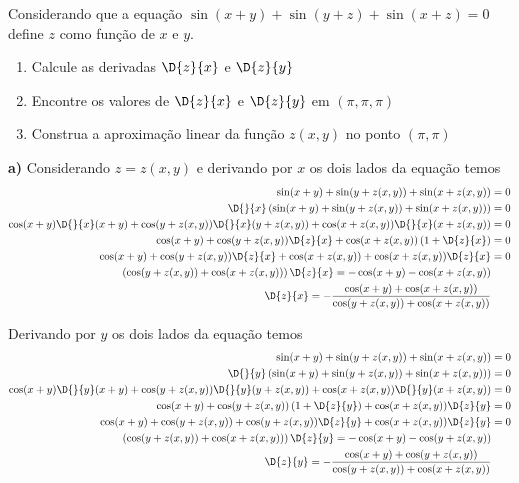 \documentclass[a4paper,12pt,fleqn]{article}
\begin{document}

Considerando que a equação
\(
  \sin(x+y) + \sin(y+z) + \sin(x+z) = 0
\)
define $z$ como função de $x$ e $y$.
\begin{enumerate}[label=\alph*)]
  \item Calcule as derivadas \(\D{z}{x}\) e \(\D{z}{y}\)
  \item Encontre os valores de \(\D{z}{x}\) e \(\D{z}{y}\) em \((\pi, \pi, \pi)\)
  \item Construa a aproximação linear da função $z(x, y)$ no ponto \((\pi, \pi)\)
\end{enumerate}
\clearpagequestiononly

\begin{answer}
  \setlength{\jot}{6pt}
  \vspace{\baselineskip}
  \textbf{a)\;}
  Considerando $z=z(x, y)$ e derivando por $x$ os dois lados da equação temos
  \begin{align*}
    \sin(x+y) + \sin(y+z(x, y)) + \sin(x+z(x, y))                                     & = 0 \\
    \D{}{x}\left(\sin(x+y) + \sin(y+z(x, y)) + \sin(x+z(x, y))\right)                 & = 0 \\
    \cos(x+y)\D{}{x}(x+y) + \cos(y+z(x, y))\D{}{x}(y+z(x, y)) + \cos(x+z(x, y))\D{}{x}(x+z(x, y)) & = 0 \\
    \cos(x+y) + \cos(y+z(x, y))\D{z}{x} + \cos(x+z(x, y))\left(1+\D{z}{x}\right)      & = 0 \\
    \cos(x+y) + \cos(y+z(x, y))\D{z}{x} + \cos(x+z(x, y)) + \cos(x+z(x, y))\D{z}{x}   & = 0 \\
    \left(\cos(y+z(x, y))+\cos(x+z(x, y))\right)\D{z}{x}  = -\cos(x+y) - \cos(x+z(x, y))    \\
    \D{z}{x}  = -\frac{\cos(x+y)+\cos(x+z(x, y))}{\cos(y+z(x, y))+\cos(x+z(x, y))}
  \end{align*}

  \clearpage
  Derivando por $y$ os dois lados da equação temos
  \begin{align*}
    \sin(x+y) + \sin(y+z(x, y)) + \sin(x+z(x, y))                                     & = 0 \\
    \D{}{y}\left(\sin(x+y) + \sin(y+z(x, y)) + \sin(x+z(x, y))\right)                 & = 0 \\
    \cos(x+y)\D{}{y}(x+y) + \cos(y+z(x, y))\D{}{y}(y+z(x, y)) + \cos(x+z(x, y))\D{}{y}(x+z(x, y)) & = 0 \\
    \cos(x+y) + \cos(y+z(x, y))\left(1+\D{z}{y}\right) + \cos(x+z(x, y))\D{z}{y}      & = 0 \\
    \cos(x+y) + \cos(y+z(x, y)) + \cos(y+z(x, y))\D{z}{y} + \cos(x+z(x, y))\D{z}{y}   & = 0 \\
    \left(\cos(y+z(x, y)) + \cos(x+z(x, y))\right)\D{z}{y}  = -\cos(x+y)-\cos(y+z(x, y))    \\
    \D{z}{y}  = -\frac{\cos(x+y)+\cos(y+z(x, y))}{\cos(y+z(x, y)) + \cos(x+z(x, y))}
  \end{align*}


\end{answer}
\end{document}
